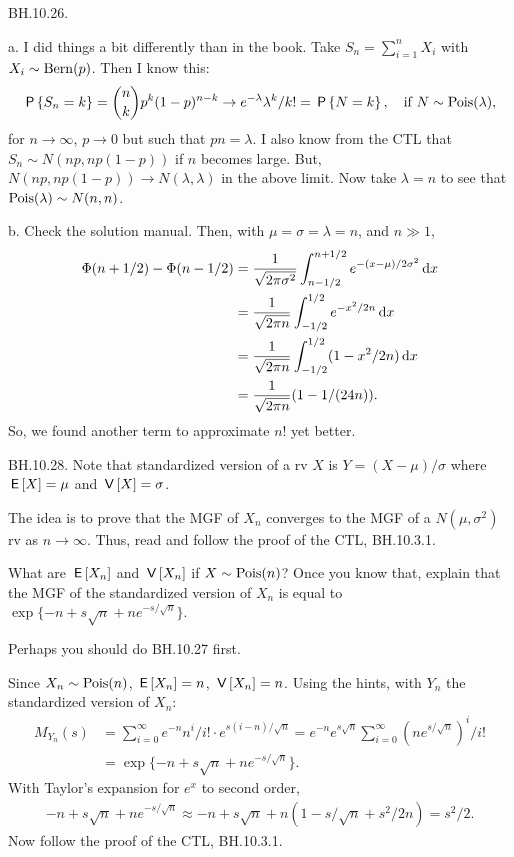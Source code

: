 \setcounter{theorem}{25}
\begin{exercise}
BH.10.26.
\begin{solution}
a.
I did things a bit differently than in the book. Take $S_n=\sum_{i=1}^n X_i$ with $X_i\sim\mathrm{Bern}(p)$. Then I know this:
\begin{align*}
\,\mathsf{P}\left\{S_n=k\right\} = {n \choose k} p^k(1-p)^{n-k} \to e^{-\lambda} \lambda^k/k! = \,\mathsf{P}\left\{N=k\right\}, \quad\text{if } N\sim\mathrm{Pois}(\lambda),
\end{align*}
for $n\to \infty$, $p\to0$ but such that $p n = \lambda$.
I also know from the CTL that $S_n\sim N(n p, n p(1-p))$ if $n$ becomes large.
But, $N(n p, n p(1-p)) \to N(\lambda, \lambda)$ in the above limit.
Now take $\lambda=n$ to see that $\mathrm{Pois}(\lambda) \sim N(n,n)$.

b.
Check the solution manual. Then, with $\mu=\sigma=\lambda=n$, and $n\gg 1$,
\begin{align*}
\Phi(n+1/2) - \Phi(n-1/2)
&= \frac 1 {\sqrt{2\pi \sigma^{2}}}\int_{n-1/2}^{n+1/2} e^{-(x-\mu)/2\sigma^{2}} \,\textrm{d}x\\
&= \frac 1 {\sqrt{2\pi n }}\int_{-1/2}^{1/2} e^{-x^{2}/2n} \,\textrm{d}x\\
&= \frac 1 {\sqrt{2\pi n }}\int_{-1/2}^{1/2} (1 - x^{2}/2n) \,\textrm{d}x\\
&= \frac 1 {\sqrt{2\pi n }} (1- 1/(24 n)).
\end{align*}
So, we found another term to approximate $n!$ yet better.
\end{solution}
\end{exercise}



\setcounter{theorem}{27}
\begin{exercise}
BH.10.28. Note that standardized version of a rv $X$ is $Y=(X-\mu)/\sigma$ where $\,\mathsf{E}\left[X\right] = \mu$ and $\,\mathsf{V}\left[X\right] = \sigma$.
\begin{hint}
The idea is to prove that the MGF of $X_n$ converges to the MGF of a $N(\mu, \sigma^{2})$ rv as $n\to\infty$. Thus, read and follow the proof of the CTL, BH.10.3.1.

What are  $\,\mathsf{E}\left[X_n\right]$ and $\,\mathsf{V}\left[X_n\right]$ if $X\sim \mathrm{Pois}(n)$?  Once you know that, explain that the MGF of the standardized version of $X_n$ is equal to  $\exp\{-n+s \sqrt n + n e^{-s/\sqrt n}\}$.

Perhaps you should do BH.10.27 first.
\end{hint}
\begin{solution}
Since $X_n\sim \mathrm{Pois}(n)$, $\,\mathsf{E}\left[X_n\right]=n$, $\,\mathsf{V}\left[X_n\right]=n$. Using the hints, with $Y_{n}$ the standardized version of $X_n$:
\begin{align*}
M_{Y_n}(s) &= \sum_{i=0}^{\infty} e^{-n} n^i/i!\cdot e^{s (i-n)/\sqrt n}
= e^{-n} e^{s\sqrt n} \sum_{i=0}^{\infty}  (ne^{s/\sqrt n})^i/i!\\
&= \exp\{-n+s \sqrt n + n e^{-s/\sqrt n}\}.
\end{align*}
With Taylor's expansion for $e^x$ to second order,
\begin{align*}
-n+s \sqrt n + n e^{-s/\sqrt n} \approx -n+s \sqrt n + n \left(1 -s/\sqrt n + s^{2}/2 n\right) =   s^2/2.
\end{align*}
Now follow the proof of the CTL, BH.10.3.1.
\end{solution}
\end{exercise}


